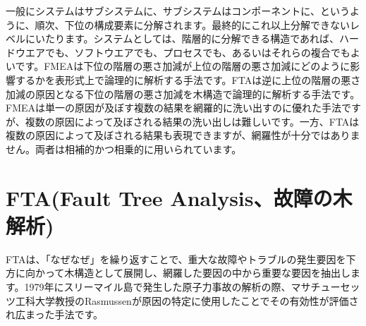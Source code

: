 一般にシステムはサブシステムに、サブシステムはコンポーネントに、というように、順次、下位の構成要素に分解されます。最終的にこれ以上分解できないレベルにいたります。システムとしては、階層的に分解できる構造であれば、ハードウエアでも、ソフトウエアでも、プロセスでも、あるいはそれらの複合でもよいです。FMEAは下位の階層の悪さ加減が上位の階層の悪さ加減にどのように影響するかを表形式上で論理的に解析する手法です。FTAは逆に上位の階層の悪さ加減の原因となる下位の階層の悪さ加減を木構造で論理的に解析する手法です。FMEAは単一の原因が及ぼす複数の結果を網羅的に洗い出すのに優れた手法ですが、複数の原因によって及ぼされる結果の洗い出しは難しいです。一方、FTAは複数の原因によって及ぼされる結果も表現できますが、網羅性が十分ではありません。両者は相補的かつ相乗的に用いられています。
\section{FTA(Fault Tree Analysis、故障の木解析)}
FTAは、「なぜなぜ」を繰り返すことで、重大な故障やトラブルの発生要因を下方に向かって木構造として展開し、網羅した要因の中から重要な要因を抽出します。1979年にスリーマイル島で発生した原子力事故の解析の際、マサチューセッツ工科大学教授のRasmussenが原因の特定に使用したことでその有効性が評価され広まった手法です。
